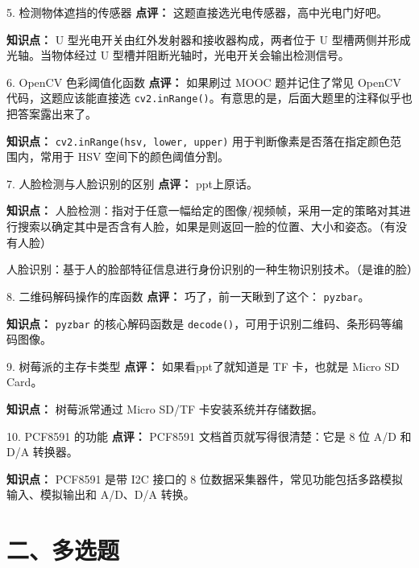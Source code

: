 \begin{question}{5. 检测物体遮挡的传感器}
\textbf{点评：} 这题直接选光电传感器，高中光电门好吧。

\textbf{知识点：} U 型光电开关由红外发射器和接收器构成，两者位于 U 型槽两侧并形成光轴。当物体经过 U 型槽并阻断光轴时，光电开关会输出检测信号。
\end{question}

\begin{question}{6. OpenCV 色彩阈值化函数}
\textbf{点评：} 如果刷过 MOOC 题并记住了常见 OpenCV 代码，这题应该能直接选 \texttt{cv2.inRange()}。有意思的是，后面大题里的注释似乎也把答案露出来了。

\textbf{知识点：} \texttt{cv2.inRange(hsv, lower, upper)} 用于判断像素是否落在指定颜色范围内，常用于 HSV 空间下的颜色阈值分割。
\end{question}

\begin{question}{7. 人脸检测与人脸识别的区别}
\textbf{点评：} ppt上原话。

\textbf{知识点：} 人脸检测：指对于任意一幅给定的图像/视频帧，采用一定的策略对其进行搜索以确定其中是否含有人脸，如果是则返回一脸的位置、大小和姿态。（有没有人脸）

人脸识别：基于人的脸部特征信息进行身份识别的一种生物识别技术。（是谁的脸） 
\end{question}

\begin{question}{8. 二维码解码操作的库函数}
\textbf{点评：} 巧了，前一天瞅到了这个： \texttt{pyzbar}。

\textbf{知识点：} \texttt{pyzbar} 的核心解码函数是 \texttt{decode()}，可用于识别二维码、条形码等编码图像。
\end{question}

\begin{question}{9. 树莓派的主存卡类型}
\textbf{点评：} 如果看ppt了就知道是 TF 卡，也就是 Micro SD Card。

\textbf{知识点：} 树莓派常通过 Micro SD/TF 卡安装系统并存储数据。
\end{question}

\begin{question}{10. PCF8591 的功能}
\textbf{点评：} PCF8591 文档首页就写得很清楚：它是 8 位 A/D 和 D/A 转换器。

\textbf{知识点：} PCF8591 是带 I2C 接口的 8 位数据采集器件，常见功能包括多路模拟输入、模拟输出和 A/D、D/A 转换。
\end{question}

\section{二、多选题}

